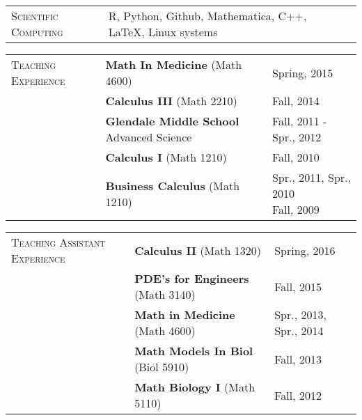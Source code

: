 \documentclass[11pt]{article}
\newcommand{\cellone}{3.5cm} %
\newcommand{\celltwo}{11cm}
\newcommand{\cellthree}{4cm}
\newcommand{\latex}{\LaTeX}
\newcommand{\spa}{\vspace{.4in}}
\begin{document}
\spa

\begin{tabularx}{\textwidth}{p{\cellone} p{\celltwo} p{\cellthree}}
\parbox[t][0cm]{\cellone}{S\textsc{cientific} C\textsc{omputing}} & \parbox[t][0cm]{\celltwo}{R, Python, Github, Mathematica, C++, \latex, Linux systems} 
\end{tabularx}

\spa

\begin{tabularx}{\textwidth}{p{\cellone} p{\celltwo} p{\cellthree}}

\parbox[t][0cm]{\cellone}{T\textsc{eaching} E\textsc{xperience}} &  \parbox[t][0cm]{\celltwo}{{\bf  Math In Medicine} (Math 4600)}  &  Spring, 2015 \\ 
					          &  \parbox[t][0cm]{\celltwo}{{\bf  Calculus III} (Math 2210)} &  Fall, 2014 \\
					          &  \parbox[t]{\celltwo}{{\bf Glendale Middle School} Advanced Science}   &  \parbox[t]{\cellthree}{Fall, 2011 - Spr., 2012} \\				
					          &  \parbox[t]{\celltwo}{{\bf Calculus I} (Math 1210)}   &  \parbox[t]{\cellthree}{Fall, 2010} \\					          
					          &  \parbox[t]{\celltwo}{{\bf  Business Calculus} (Math 1210)}   &  \parbox[t]{\cellthree}{Spr., 2011, Spr., 2010 \\ Fall, 2009 }

\end{tabularx}

\spa

\begin{tabularx}{\textwidth}{p{\cellone} p{\celltwo} p{\cellthree}}
  
  \parbox[t][0cm]{\cellone}{T\textsc{eaching} A\textsc{ssistant} E\textsc{xperience}} & \parbox[t][0cm]{\celltwo}{{\bf  Calculus II} (Math 1320)}  &  \parbox[t][]{\cellthree}{Spring, 2016}\\ 
  
  
  & \parbox[t][0cm]{\celltwo}{{\bf  PDE's for Engineers} (Math 3140)}  &  \parbox[t][]{\cellthree}{Fall, 2015}\\ 
  
  &  \parbox[t][0cm]{\celltwo}{{\bf  Math in Medicine} (Math 4600)}  &  \parbox[t][]{\cellthree}{Spr., 2013, Spr., 2014}\\  
  &  \parbox[t][0cm]{\celltwo}{{\bf  Math Models In Biol} (Biol 5910)}  &  \parbox[t][]{\cellthree}{Fall, 2013} \\ 					          
  &  \parbox[t][1cm]{\celltwo}{{\bf  Math Biology I} (Math 5110)}  &  Fall, 2012 
\end{tabularx}
\end{document}
